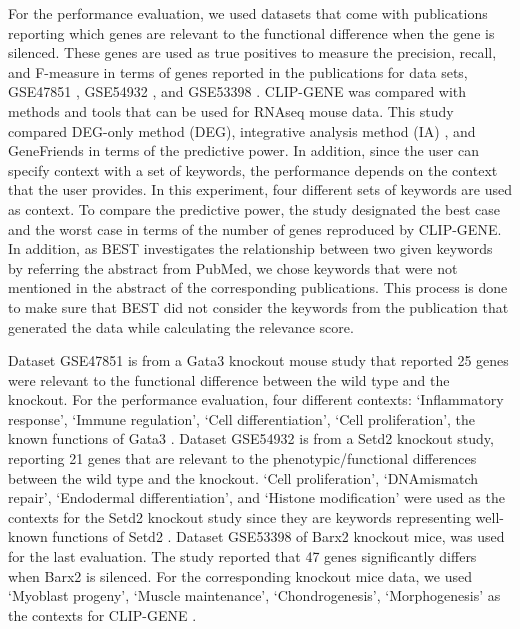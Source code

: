 \documentclass[oneside,phd]{snuthesis}
\begin{document}
For the performance evaluation, we used datasets that come with publications reporting which genes are relevant to the functional difference when the gene is silenced.
These genes are used as true positives to measure the precision, recall, and F-measure in terms of genes reported in the publications for data sets, GSE47851 \citep{yagi2014transcription}, GSE54932 \citep{ZHANG20141989}, and GSE53398 \citep{zhuang2014barx2}.
CLIP-GENE was compared with methods and tools that can be used for RNAseq mouse data. 
This study compared DEG-only method (DEG), integrative analysis method (IA) \citep{hur2015combined}, and GeneFriends \citep{van2012genefriends} in terms of the predictive power.
In addition, since the user can specify context with a set of keywords, the performance depends on the context that the user provides. 
In this experiment, four different sets of keywords are used as context. 
To compare the predictive power, the study designated the best case and the worst case in terms of the number of genes reproduced by CLIP-GENE. 
In addition, as BEST investigates the relationship between two given keywords by referring
the abstract from PubMed, we chose keywords that were not mentioned in the abstract of the corresponding publications. 
This process is done to make sure that BEST did not consider the keywords from the publication
that generated the data while calculating the relevance score.

Dataset GSE47851 is from a Gata3 knockout mouse study that reported 25 genes were relevant to the functional difference between the wild type and the knockout.
For the performance evaluation, four different contexts: ‘Inflammatory response’, ‘Immune regulation’, ‘Cell differentiation’, ‘Cell proliferation’, the known functions of Gata3 \citep{yagi2014transcription,WAN2014233}.
Dataset GSE54932 is from a Setd2 knockout study, reporting 21 genes that are relevant to
the phenotypic/functional differences between the wild type and the knockout. 
‘Cell proliferation’, ‘DNAmismatch repair’, ‘Endodermal differentiation’, and ‘Histone modification’
were used as the contexts for the Setd2 knockout study since they are keywords representing well-known functions of Setd2 \citep{ZHANG20141989, Feng2015}. 
Dataset GSE53398 of Barx2 knockout mice, was used for the last evaluation. 
The study reported that 47 genes significantly differs when Barx2 is silenced. 
For the corresponding knockout mice data, we used ‘Myoblast progeny’, ‘Muscle maintenance’,  ‘Chondrogenesis’, ‘Morphogenesis’ as the contexts for CLIP-GENE \citep{OLGUIN2004375, mi2016panther, Zammit347, meech2012barx2, Meech2135, Tsau3307}.
\end{document}
